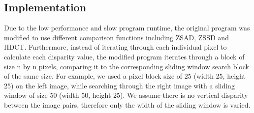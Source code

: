 \documentclass[conference]{IEEEtran}
\begin{document}
\subsection{Implementation}
Due to the low performance and slow program runtime, the original program was modified to use different comparison functions including ZSAD, ZSSD and HDCT. Furthermore, instead of iterating through each individual pixel to calculate each disparity value, the modified program iterates through a block of size n by n pixels, comparing it to the corresponding sliding window search block of the same size. For example, we used a pixel block size of 25 (width 25, height 25) on the left image, while searching through the right image with a sliding window of size 50 (width 50, height 25). We assume there is no vertical disparity between the image pairs, therefore only the width of the sliding window is varied.
\end{document}

